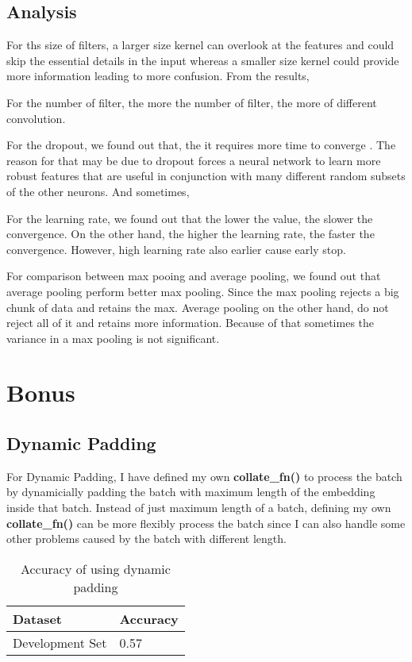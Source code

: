 \documentclass{article}
\begin{document}
\subsection{Analysis}
For ths size of filters, a larger size kernel can overlook at the features and could skip the essential details in the input whereas a smaller size kernel could provide more information leading to more confusion. From the results,

For the number of filter, the more the number of filter, the more of different convolution. 

For the dropout, we found out that, the it requires more time to converge . The reason for that may be due to dropout forces a neural network to learn more robust features that are useful in conjunction with many different random subsets of the other neurons. And sometimes, 

For the learning rate, we found out that the lower the value, the slower the convergence. On the other hand, the higher the learning rate, the faster the convergence. However, high learning rate also earlier cause early stop.

For comparison between max pooing and average pooling, we found out that average pooling perform better max pooling. Since the max pooling rejects a big chunk of data and retains the max. Average pooling on the other hand, do not reject all of it and retains more information. Because of that sometimes the variance in a max pooling is not significant.

\section{Bonus}

\subsection{Dynamic Padding}
For Dynamic Padding, I have defined my own \textbf{collate\_fn()} to process the batch by dynamicially padding the batch with maximum length of the embedding inside that batch. Instead of just maximum length of a batch, defining my own \textbf{collate\_fn()} can be more flexibly process the batch since I can also handle some other problems caused by the batch with different length.

\begin{table}[htb]
	\caption{Accuracy of using dynamic padding}
	\label{sample-table}
	\centering
	\begin{tabular}{ll}
		\toprule
		\cmidrule{1-2}
		Dataset &Accuracy\\
		\midrule
		Development Set & 0.57  \\
		\bottomrule
	\end{tabular}
\end{table}
\end{document}
